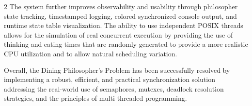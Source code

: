 \documentclass[11pt,a4paper]{article}
\begin{document}
\begin{multicols*}{2}
The system further improves observability and usability through philosopher state tracking, timestamped logging, colored synchronized console output, and runtime state table visualization. The ability to use independent POSIX threads allows for the simulation of real concurrent execution by providing the use of thinking and eating times that are randomly generated to provide a more realistic CPU utilization and to allow natural scheduling variation.

Overall, the Dining Philosopher's Problem has been successfully resolved by implementing a robust, efficient, and practical synchronization solution addressing the real-world use of semaphores, mutexes, deadlock resolution strategies, and the principles of multi-threaded programming.

\end{multicols*}

\newpage
\end{document}
